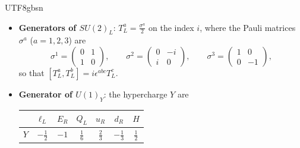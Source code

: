 \documentclass[11pt,a4paper,oneside]{report}
\begin{document}
\begin{CJK*}{UTF8}{gbsn}
\begin{itemize}
\item \textbf{\boldmath Generators of $SU(2)_L$}: $T_L^a=\frac{\sigma^a}2$ on the index $i$, where the Pauli matrices $\sigma^a$ ($a=1,2,3$) are
\begin{equation*}
\sigma^1=\begin{pmatrix}0&1\\1&0\end{pmatrix},\qquad
\sigma^2=\begin{pmatrix}0&-i\\i&0\end{pmatrix},\qquad
\sigma^3=\begin{pmatrix}1&0\\0&-1\end{pmatrix},
\tag{5.46}\label{eq:5.46}
\end{equation*}
so that $[T_L^a,T_L^b]=i\epsilon^{abc}T_L^c$.

\item \textbf{\boldmath Generator of $U(1)_Y$}: the hypercharge $Y$ are

\begin{center}
\renewcommand{\arraystretch}{1.2}
\begin{tabular}{ccccccc}
\toprule
 & $\ell_L$ & $E_R$ & $Q_L$ & $u_R$ & $d_R$ & $H$ \\
\midrule
$Y$ & $-\frac12$ & $-1$ & $\frac16$ & $\frac23$ & $-\frac13$ & $\frac12$ \\
\bottomrule
\end{tabular}
\end{center}


\end{itemize}
\end{CJK*}
\end{document}
